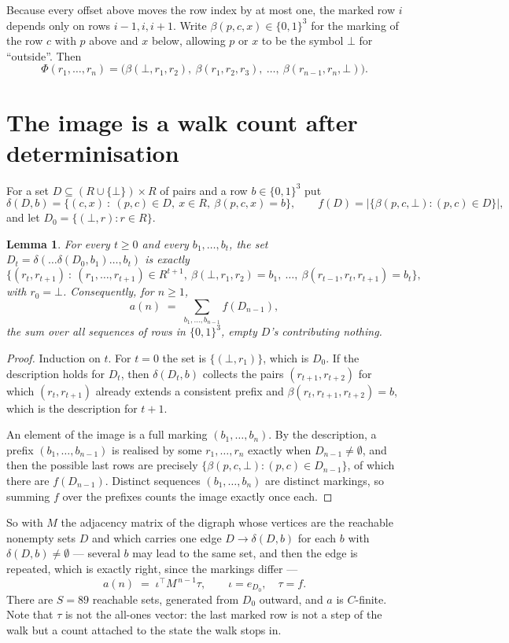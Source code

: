 \documentclass[11pt,a4paper]{article}
\theoremstyle{plain}
\newtheorem{lemma}[theorem]{Lemma}
\theoremstyle{definition}
\begin{document}
Because every offset above moves the row index by at most one, the marked row $i$ depends only
on rows $i-1,i,i+1$. Write $\beta(p,c,x)\in\{0,1\}^{3}$ for the marking of the row $c$
with $p$ above and $x$ below, allowing $p$ or $x$ to be the symbol $\bot$ for ``outside''.
Then
\[
\Phi(r_1,\dots,r_n)=\bigl(\beta(\bot,r_1,r_2),\ \beta(r_1,r_2,r_3),\ \dots,\
\beta(r_{n-1},r_n,\bot)\bigr).
\]

\section{The image is a walk count after determinisation}

For a set $D\subseteq(R\cup\{\bot\})\times R$ of pairs and a row $b\in\{0,1\}^{3}$ put
\[
\delta(D,b)=\{(c,x)\ :\ (p,c)\in D,\ x\in R,\ \beta(p,c,x)=b\},\qquad
f(D)=\bigl|\{\beta(p,c,\bot):(p,c)\in D\}\bigr| ,
\]
and let $D_0=\{(\bot,r):r\in R\}$.

\begin{lemma}\label{lem:det}
For every $t\ge0$ and every $b_1,\dots,b_t$, the set
$D_t=\delta(\dots\delta(D_0,b_1)\dots,b_t)$ is exactly
\[
\{(r_t,r_{t+1})\ :\ (r_1,\dots,r_{t+1})\in R^{t+1},\ \beta(\bot,r_1,r_2)=b_1,\ \dots,\
\beta(r_{t-1},r_t,r_{t+1})=b_t\} ,
\]
with $r_0=\bot$. Consequently, for $n\ge1$,
\[
a(n)\;=\;\sum_{b_1,\dots,b_{n-1}}f(D_{n-1}),
\]
the sum over all sequences of rows in $\{0,1\}^{3}$, empty $D$'s contributing nothing.
\end{lemma}

\begin{proof}
Induction on $t$. For $t=0$ the set is $\{(\bot,r_1)\}$, which is $D_0$. If the description
holds for $D_t$, then $\delta(D_t,b)$ collects the pairs $(r_{t+1},r_{t+2})$ for which
$(r_t,r_{t+1})$ already extends a consistent prefix and
$\beta(r_t,r_{t+1},r_{t+2})=b$, which is the description for $t+1$.

An element of the image is a full marking $(b_1,\dots,b_n)$. By the description, a prefix
$(b_1,\dots,b_{n-1})$ is realised by some $r_1,\dots,r_n$ exactly when $D_{n-1}\neq
\emptyset$, and then the possible last rows are precisely
$\{\beta(p,c,\bot):(p,c)\in D_{n-1}\}$, of which there are $f(D_{n-1})$. Distinct
sequences $(b_1,\dots,b_n)$ are distinct markings, so summing $f$ over the prefixes counts the
image exactly once each.
\end{proof}

So with $M$ the adjacency matrix of the digraph whose vertices are the reachable nonempty sets
$D$ and which carries one edge $D\to\delta(D,b)$ for each $b$ with $\delta(D,b)\neq\emptyset$
--- several $b$ may lead to the same set, and then the edge is repeated, which is exactly
right, since the markings differ ---
\[
a(n)\;=\;\iota^{\!\top}M^{\,n-1}\tau,\qquad \iota=e_{D_0},\quad \tau=f .
\]
There are $S=89$ reachable sets, generated from $D_0$ outward, and $a$ is $C$-finite. Note
that $\tau$ is not the all-ones vector: the last marked row is not a step of the walk but a
count attached to the state the walk stops in.
\end{document}
